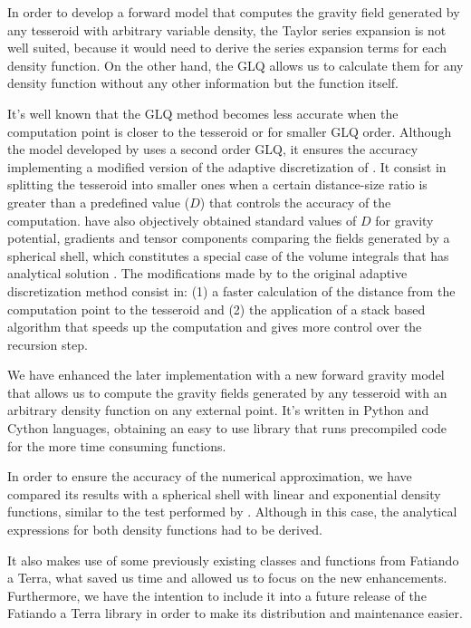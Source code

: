 \documentclass[extra]{gji}
\begin{document}
In order to develop a forward model that computes the gravity field generated by any tesseroid with arbitrary variable density, the Taylor series expansion is not well suited, because it would need to derive the series expansion terms for each density function.
On the other hand, the GLQ allows us to calculate them for any density function without any other information but the function itself.

It's well known that the GLQ method becomes less accurate when the computation point is closer to the tesseroid \citep{Ku1977} or for smaller GLQ order. 
Although the model developed by \citet{Uieda2016} uses a second order GLQ, it ensures the accuracy implementing a modified version of the adaptive discretization of \citet{Li2011}.
It consist in splitting the tesseroid into smaller ones when a certain distance-size ratio is greater than a predefined value ($D$) that controls the accuracy of the computation. 
\citet{Uieda2016} have also objectively obtained standard values of $D$ for gravity potential, gradients and tensor components comparing the fields generated by a spherical shell, which constitutes a special case of the volume integrals that has analytical solution \citep{LaFehr1991, Mikuska2006, Grombein2013}.
The modifications made by \citet{Uieda2016} to the original adaptive discretization method \citep{Li2011} consist in:
(1) a faster calculation of the distance from the computation point to the tesseroid and 
(2) the application of a stack based algorithm that speeds up the computation and gives more control over the recursion step.

We have enhanced the later implementation with a new forward gravity model that allows us to compute the gravity fields generated by any tesseroid with an arbitrary density function on any external point.
It's written in Python and Cython languages, obtaining an easy to use library that runs precompiled code for the more time consuming functions.

In order to ensure the accuracy of the numerical approximation, we have compared its results with a spherical shell with linear and exponential density functions, similar to the test performed by \cite{Uieda2016}.
Although in this case, the analytical expressions for both density functions had to be derived.

It also makes use of some previously existing classes and functions from Fatiando a Terra, what saved us time and allowed us to focus on the new enhancements.
Furthermore, we have the intention to include it into a future release of the Fatiando a Terra library in order to make its distribution and maintenance easier.
\end{document}
